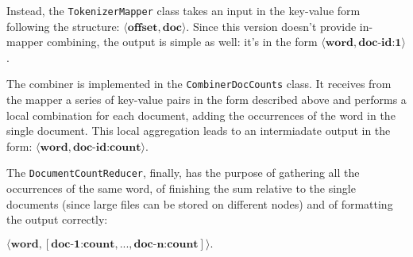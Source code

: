 Instead, the \texttt{TokenizerMapper} class takes an input in the key-value form following the structure: $\langle \textbf{offset}, \textbf{doc}\rangle $. Since this version doesn't provide in-mapper combining, the output is simple as well: it's in the form $ \langle \textbf{word}, \textbf{doc-id:1} \rangle $. 

The combiner is implemented in the \texttt{CombinerDocCounts} class. It receives from the mapper a series of key-value pairs in the form described above and performs a local combination for each document, adding the occurrences of the word in the single document. This local aggregation leads to an intermiadate output in the form: $ \langle \textbf{word}, \textbf{doc-id:count} \rangle $.

The \texttt{DocumentCountReducer}, finally, has the purpose of gathering all the occurrences of the same word, of finishing the sum relative to the single documents (since large files can be stored on different nodes) and of formatting the output correctly: 

$ \langle \textbf{word}, [\textbf{doc-1:count}, ..., \textbf{doc-n:count}] \rangle. $


